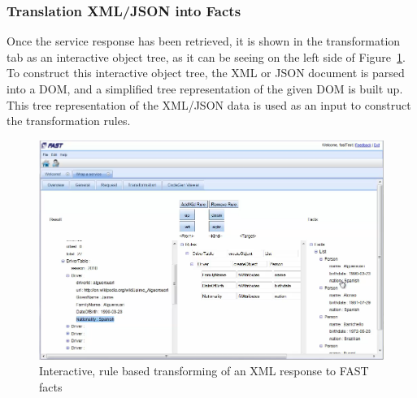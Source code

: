 \documentclass{fast_latex}
\begin{document}
\subsubsection{Translation XML/JSON into Facts} %
\label{ssub:translation_xml_into_facts}

Once the service response has been retrieved, it is shown in the transformation tab as an interactive object tree, as it can be seeing on the left side of Figure~\ref{fig:response_service_execution}. To construct this interactive object tree, the XML or JSON document is parsed into a DOM, and a simplified tree representation of the given DOM is built up. This tree representation of the XML/JSON data is used as an input to construct the transformation rules.

\begin{figure}
  \begin{center}
      \includegraphics[angle=90,width=0.8\linewidth]{images/ServiceWrapperToolGVSWithTransformationRulesF1.png}
    \caption{Interactive, rule based transforming of an XML response to FAST facts}
    \label{fig:response_service_execution}
  \end{center}
\end{figure}
\end{document}
